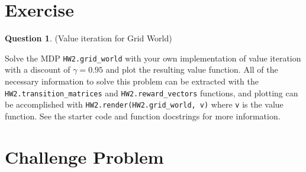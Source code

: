 \documentclass{article}
\theoremstyle{definition}
\newtheorem{question}[thm]{Question}
\begin{document}
\section{Exercise}

\begin{question} \label{q:gw}
    (Value iteration for Grid World)

    Solve the MDP \texttt{HW2.grid\_world} with your own implementation of value iteration with a discount of $\gamma=0.95$ and plot the resulting value function. All of the necessary information to solve this problem can be extracted with the \texttt{HW2.transition\_matrices} and \texttt{HW2.reward\_vectors} functions, and plotting can be accomplished with \texttt{HW2.render(HW2.grid\_world, v)} where \texttt{v} is the value function. See the starter code and function docstrings for more information.
\end{question}

\section{Challenge Problem}
\end{document}
